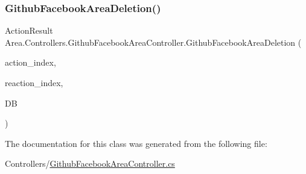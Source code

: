 \mbox{\label{classArea_1_1Controllers_1_1GithubFacebookAreaController_a8611f6f02f968f08b14a1888a84900b7}} 
\subsubsection{\texorpdfstring{Github\+Facebook\+Area\+Deletion()}{GithubFacebookAreaDeletion()}}
{\footnotesize\ttfamily Action\+Result Area.\+Controllers.\+Github\+Facebook\+Area\+Controller.\+Github\+Facebook\+Area\+Deletion (\begin{DoxyParamCaption}\item[{string}]{action\+\_\+index,  }\item[{string}]{reaction\+\_\+index,  }\item[{\mbox{[}\+From\+Services\mbox{]} \mbox{\hyperlink{classArea_1_1DAT_1_1AreaDbContext}{Area\+Db\+Context}}}]{DB }\end{DoxyParamCaption})\hspace{0.3cm}{\ttfamily [inline]}}



The documentation for this class was generated from the following file\+:\begin{DoxyCompactItemize}
\item 
Controllers/\mbox{\hyperlink{GithubFacebookAreaController_8cs}{Github\+Facebook\+Area\+Controller.\+cs}}\end{DoxyCompactItemize}
